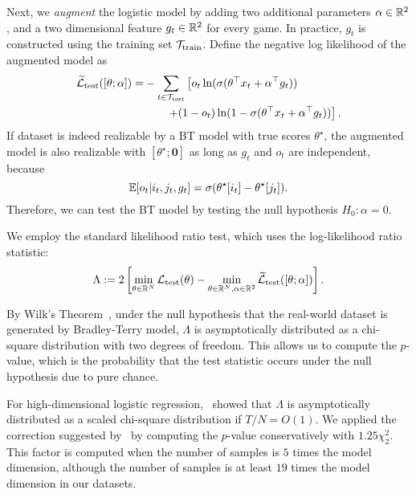 Next, we \emph{augment} the logistic model by adding two additional parameters $\alpha\in \mathbb{R}^2$, and a two dimensional feature $g_t\in \mathbb{R}^2$ for every game. In practice, $g_t$ is constructed using the training set $\mathcal{T}_{\rm train}$. Define the negative log likelihood of the augmented model as
\begin{align*}
\Tilde{\cL}_{\rm test}([\theta; \alpha])=& -\sum_{t\in \cT_{\rm test}} \left[o_t\ln(\sigma(\theta^\top x_t + \alpha^\top g_t))\right. \\
& \qquad \left. + (1-o_t)\ln(1-\sigma(\theta^\top x_t + \alpha^\top g_t))\right].
\end{align*}
If dataset is indeed realizable by a BT model with true scores $\theta^\star$, the augmented model is also realizable with $[\theta^\star;\textbf{0}]$ as long as $g_t$ and $o_t$ are independent, because
\[
\mathbb{E}[o_t|i_t,j_t,g_t] = \sigma(\theta^\star[i_t] - \theta^\star [j_t]).
\]
Therefore, we can test the BT model by testing the null hypothesis $H_0:\alpha=0$.

We employ the standard likelihood ratio test, which uses the log-likelihood ratio statistic:
\[
\Lambda := 2\left[\min_{\theta\in\mathbb{R}^N}\mathcal{L}_{\rm test}(\theta) - \min_{\theta\in\mathbb{R}^{N},\alpha\in\mathbb{R}^2}\widetilde{\mathcal{L}}_{\rm test}([\theta;\alpha])\right].
\]


\iffalse
\begin{align*}
\tilde\cL(\tilde\theta)&:= - o_t\log(\sigma(\tilde\theta[i_t]-\tilde\theta[j_t]+\tilde\theta_{N+1}\alpha_t+\tilde\theta_{N+2}\beta_t))\\
&- (1-o_t)\log(1-\sigma(\tilde\theta[i_t]-\tilde\theta[j_t]+\tilde\theta_{N+1}\alpha_t+\tilde\theta_{N+2}\beta_t)).
\end{align*}
\fi
By Wilk's Theorem~\citep{wilks1938large,sur2019likelihood}, under the null hypothesis that the real-world dataset is generated by Bradley-Terry model,
$\Lambda$
is asymptotically distributed as a chi-square distribution with two degrees of freedom. This allows us to compute the $p$-value, which is the probability that the test statistic occurs under the null hypothesis due to pure chance.

For high-dimensional logistic regression,~\citet{sur2019likelihood} showed that $\Lambda$ is asymptotically distributed as a scaled chi-square distribution if $T/N = O(1)$. We applied the correction suggested by~\citet{sur2019likelihood}  by computing the $p$-value conservatively with $1.25\chi^2_2$. This factor is computed when the number of samples is $5$ times the model dimension, although the number of samples is at least $19$ times the model dimension in our datasets.

